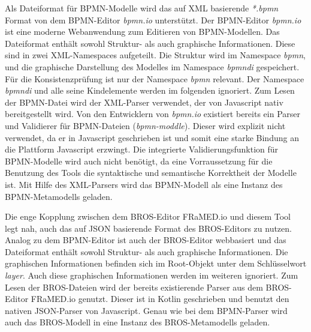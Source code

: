 Als Dateiformat für BPMN-Modelle wird das auf XML basierende \emph{*.bpmn} Format von dem BPMN-Editor \emph{bpmn.io} unterstützt.
Der BPMN-Editor \emph{bpmn.io} ist eine moderne Webanwendung zum Editieren von BPMN-Modellen.
Das Dateiformat enthält sowohl Struktur- als auch graphische Informationen.
Diese sind in zwei XML-Namespaces aufgeteilt.
Die Struktur wird im Namespace \emph{bpmn}, und die graphische Darstellung des Modelles im Namespace \emph{bpmndi} gespeichert.
Für die Konsistenzprüfung ist nur der Namespace \emph{bpmn} relevant.
Der Namespace \emph{bpmndi} und alle seine Kindelemente werden im folgenden ignoriert.
Zum Lesen der BPMN-Datei wird der XML-Parser verwendet, der von Javascript nativ bereitgestellt wird.
Von den Entwicklern von \emph{bpmn.io} existiert bereits ein Parser und Validierer für BPMN-Dateien (\emph{bpmn-moddle}).
Dieser wird explizit nicht verwendet, da er in Javascript geschrieben ist und somit eine starke Bindung an die Plattform Javascript erzwingt.
Die integrierte Validierungsfunktion für BPMN-Modelle wird auch nicht benötigt, da eine Vorraussetzung für die Benutzung des Tools die syntaktische und semantische Korrektheit der Modelle ist. 
Mit Hilfe des XML-Parsers wird das BPMN-Modell als eine Instanz des BPMN-Metamodells geladen.

Die enge Kopplung zwischen dem BROS-Editor FRaMED.io und diesem Tool legt nah, auch das auf JSON basierende Format des BROS-Editors zu nutzen.
Analog zu dem BPMN-Editor ist auch der BROS-Editor webbasiert und das Dateiformat enthält sowohl Struktur- als auch graphische Informationen.
Die graphischen Informationen befinden sich im Root-Objekt unter dem Schlüsselwort \emph{layer}.
Auch diese graphischen Informationen werden im weiteren ignoriert.
Zum Lesen der BROS-Dateien wird der bereits existierende Parser aus dem BROS-Editor FRaMED.io genutzt.
Dieser ist in Kotlin geschrieben und benutzt den nativen JSON-Parser von Javascript.
Genau wie bei dem BPMN-Parser wird auch das BROS-Modell in eine Instanz des BROS-Metamodells geladen.

